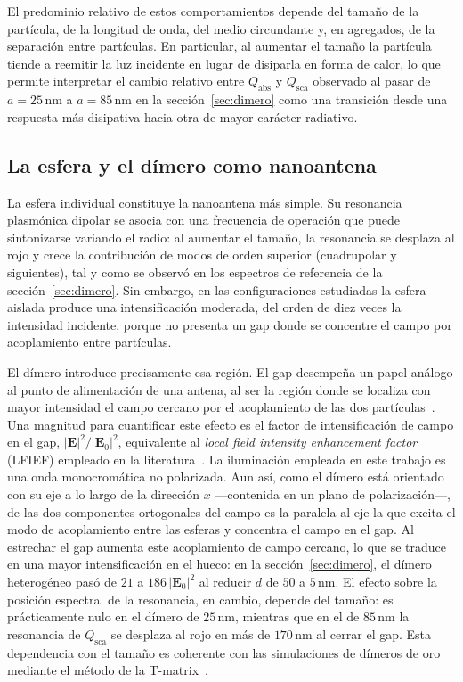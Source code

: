 El predominio relativo de estos comportamientos depende del tamaño de la
partícula, de la longitud de onda, del medio circundante y, en agregados, de
la separación entre partículas. En particular, al aumentar el tamaño la
partícula tiende a reemitir la luz incidente en lugar de disiparla en forma
de calor, lo que permite interpretar el cambio relativo entre $Q_\text{abs}$
y $Q_\text{sca}$ observado al pasar de $a=25\,\text{nm}$ a $a=85\,\text{nm}$
en la sección~\ref{sec:dimero} como una transición desde una respuesta más
disipativa hacia otra de mayor carácter radiativo.

\subsection{La esfera y el dímero como nanoantena}
\label{subsec:esfera_dimero_antena}

La esfera individual constituye la nanoantena más simple. Su resonancia
plasmónica dipolar se asocia con una frecuencia de operación que puede
sintonizarse variando el radio: al aumentar el tamaño, la resonancia se
desplaza al rojo y crece la contribución de modos de orden superior
(cuadrupolar y siguientes), tal y como se observó en los espectros de
referencia de la sección~\ref{sec:dimero}. Sin embargo, en las
configuraciones estudiadas la esfera aislada produce una intensificación
moderada, del orden de diez veces la intensidad incidente, porque no presenta
un gap donde se concentre el campo por acoplamiento entre partículas.

El dímero introduce precisamente esa región. El gap desempeña un papel
análogo al punto de alimentación de una antena, al ser la región donde se
localiza con mayor intensidad el campo cercano por el acoplamiento de las dos
partículas~\cite{Yousif2013}. Una magnitud para cuantificar este
efecto es el factor de intensificación de campo en el gap,
$|\mathbf{E}|^2/|\mathbf{E}_0|^2$, equivalente al \emph{local field intensity
enhancement factor} (LFIEF) empleado en la literatura~\cite{Yousif2013}.
La iluminación empleada en este trabajo es una onda monocromática no
polarizada. Aun así, como el dímero está orientado con su eje a lo largo de
la dirección $x$ —contenida en un plano de polarización—, de las dos
componentes ortogonales del campo es la paralela al eje la que excita el modo
de acoplamiento entre las esferas y concentra el campo en el gap. Al estrechar
el gap aumenta este acoplamiento de campo cercano, lo que se traduce en una
mayor intensificación en el hueco: en la sección~\ref{sec:dimero}, el dímero
heterogéneo pasó de $21$ a $186\,|\mathbf{E}_0|^2$ al reducir $d$ de $50$ a
$5\,\text{nm}$. El efecto sobre la posición espectral de la resonancia, en
cambio, depende del tamaño: es prácticamente nulo en el dímero de
$25\,\text{nm}$, mientras que en el de $85\,\text{nm}$ la resonancia de
$Q_\text{sca}$ se desplaza al rojo en más de $170\,\text{nm}$ al cerrar el
gap. Esta dependencia con el tamaño es coherente con las simulaciones de
dímeros de oro mediante el método de la T-matrix~\cite{Yousif2013}.


